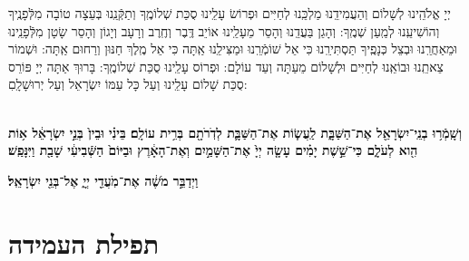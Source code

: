 \documentclass[twoside, openany, parskip=half, 11pt]{book}
\begin{document}
\ahavasolam

\shema 

\veahavta

\vehaya 

\vayomer{}

\emesveemuna

 יְיָ אֱלֹהֵֽינוּ לְשָׁלוֹם וְהַעֲמִידֵֽנוּ מַלְכֵּֽנוּ לְחַיִּים וּפְרוֹשׂ עָלֵֽינוּ סֻכַּת שְׁלוֹמֶֽךָ וְתַקְּֿנֵֽנוּ בְּעֵצָה טוֹבָה מִלְּֿפָנֶֽיךָ וְהוֹשִׁיעֵֽנוּ לְמַֽעַן שְׁמֶֽךָ: וְהָגֵן בַּעֲדֵֽנוּ וְהָסֵר מֵעָלֵֽינוּ אוֹיֵב דֶּֽבֶר וְחֶֽרֶב וְרָעָב וְיָגוֹן וְהָסֵר שָׂטָן מִלְּֿפָנֵֽינוּ וּמֵאַחֲרֵֽנוּ וּבְצֵל כְּנָפֶֽיךָ תַּסְתִּירֵֽנוּ כִּי אֵל שׁוֹמְֿרֵֽנוּ וּמַצִּילֵֽנוּ אַֽתָּה כִּי אֵל מֶֽלֶךְ חַנּוּן וְרַחוּם אַֽתָּה:  וּשְׁמוֹר צֵאתֵֽנוּ וּבוֹאֵֽנוּ לְחַיִּים וּלְשָׁלוֹם מֵעַתָּה וְעַד עוֹלָם: וּפְרוֹס עָלֵֽינוּ סֻכַּת שְׁלוֹמֶֽךָ: בָּרוּךְ אַתָּה יְיָ פּוֹרֵס סֻכַּת שָׁלוֹם עָלֵֽינוּ וְעַל כָּל עַמּוֹ יִשְׂרָאֵל וְעַל יְרוּשָׁלָֽםִ:

\\
\textbf{וְשָֽׁמְֿר֥וּ בְנֵֽי־יִשְׂרָאֵ֖ל אֶת־הַשַּׁבָּ֑ת
 לַֽעֲשׂ֧וֹת אֶת־הַשַּׁבָּ֛ת לְדֹֽרֹתָ֖ם בְּרִ֥ית עוֹלָֽם׃ בֵּינִ֗י וּבֵין֙ בְּנֵ֣י יִשְׂרָאֵ֔ל א֥וֹת הִ֖וא לְעֹלָ֑ם כִּי־שֵׁ֣שֶׁת יָמִ֗ים עָשָׂ֤ה יְיָ֙ 
אֶת־הַשָּׁמַ֣יִם וְאֶת־הָאָ֔רֶץ וּבַיּוֹם֙ הַשְּֿׁבִיעִ֔י שָׁבַ֖ת וַיִּנָּפַֽשׁ׃
}

\textbf{
וַיְדַבֵּ֣ר מֹשֶׁ֔ה אֶת־מֹֽעֲדֵ֖י יְיָ֑ אֶל־בְּנֵ֖י יִשְׂרָאֵֽל׃
}



\halfkaddish


\section*{ תפילת העמידה }

\newcommand{\shabbosshuva}{בשבת שובה:}


\newcommand{\shabboskiddushhashem}{
\firstword{אַתָּה קָדוֹשׁ}
 וְשִׁמְךָ קָדוֹשׁ וּקְדוֹשִׁים בְּכָל יוֹם יְהַלֲלוּךָ סֶּֽלָה: בָּרוּךְ אַתָּה יְיָ *הָאֵל 
(*\instruction{בשבת שובה:} 
הַמֶּֽלֶךְ)
 הַקָּדוֹשׁ:
}


\newcommand{\shabboskiddushhayom}{
\firstword{אֱלֹהֵינוּ}
 וֵאלֹהֵי אֲבוֹתֵינוּ רְצֵה בִמְנוּחָתֵנוּ קַדְּֿשֵׁנוּ בְּמִצְוֹתֶיךָ וְתֵן חֶלְקֵנוּ בְּתוֹרָתֶךָ שַׂבְּֿעֵנוּ מִטּוּבֶךָ וְשַׂמְּֿחֵנוּ בִּישׁוּעָתֶךָ וְטַהֵר לִבֵּנוּ לְעָבְדְּֿךָ בֶּאֱמֶת: וְהַנְחִילֵנוּ יְיָ אֱלֹהֵינוּ בְּאַהֲבָה וּבְרָצוֹן שַׁבַּת קָדְשֶׁךָ וְיִשְׂמְֿחוּ בְךָ יִשְׂרָאֵל אוֹהֲבֵי שְׁמֶֽךָ:
 בָּרוּךְ אַתָּה יְיָ מְקַדֵּשׁ הַשַּׁבָּת:
 }
\end{document}
